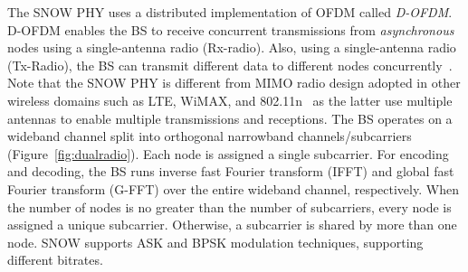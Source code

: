 The SNOW PHY uses a distributed implementation of OFDM called {\em D-OFDM}. D-OFDM enables the BS to receive concurrent transmissions from {\em asynchronous} nodes using a single-antenna radio (Rx-radio). Also, using a single-antenna radio (Tx-Radio), the BS can transmit different data to different nodes concurrently~\cite{snow, snow2, snow_ton, snow3, isnow_ton, isnow_p2p}. Note that the SNOW PHY is different from MIMO radio design adopted in other wireless domains such as LTE, WiMAX, and 802.11n~\cite{snow2} as the latter use multiple antennas to enable multiple transmissions and receptions.
The BS operates on a wideband channel split into orthogonal narrowband channels/subcarriers (Figure~\ref{fig:dualradio}). Each node is assigned a single subcarrier. 
For encoding and decoding, the BS runs inverse fast Fourier transform (IFFT) and global fast Fourier transform (G-FFT) over the entire wideband channel, respectively.
When the number of nodes is no greater than the number of subcarriers, every node is assigned a unique subcarrier. Otherwise, a subcarrier is shared by more than one node. 
SNOW supports ASK and BPSK modulation techniques, supporting different bitrates. 




